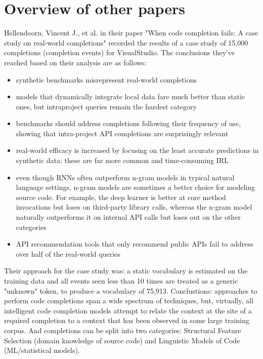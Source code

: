 \section{Overview of other papers}
Hellendoorn, Vincent J., et al. in their paper "When code completion fails: A case study on real-world
completions" recorded the results of a case study of 15,000 completions (completion events) for VisualStudio.
The conclusions they've reached based on their analysis are as follows:
\begin{itemize}
	\item synthetic benchmarks misrepresent real-world completions
    \item models that dynamically integrate local data fare much better than static ones, but intraproject queries remain the hardest category
    \item benchmarks should address completions following their frequency of use, showing that intra-project API completions are surprisingly relevant
    \item real-world efficacy is increased by focusing on the least accurate predictions in synthetic data: these are far more common and time-consuming IRL
    \item even though RNNs often outperform n-gram models in typical natural language settings, n-gram models are sometimes a better choice for modeling source code. For example, the deep learner is better at core method invocations but loses on third-party library calls, whereas the n-gram model naturally outperforms it on internal API calls but loses out on the other categories
    \item API recommendation tools that only recommend public APIs fail to address over half of the real-world queries
\end{itemize}
Their approach for the case study was: a static vocabulary is estimated on the training data and
all events seen less than 10 times are treated as a generic "unknown" token, to produce a vocabulary
of 75,913. Conclustions: approaches to perform code completions span a wide spectrum of techniques,
but, virtually, all intelligent code completion models attempt to relate the context at the site of a
required completion to a context that has been observed in some large training corpus. And completions
can be split into two categories: Structural Feature Selection (domain knowledge of source code)
and Linguistic Models of Code (ML/statistical models).


